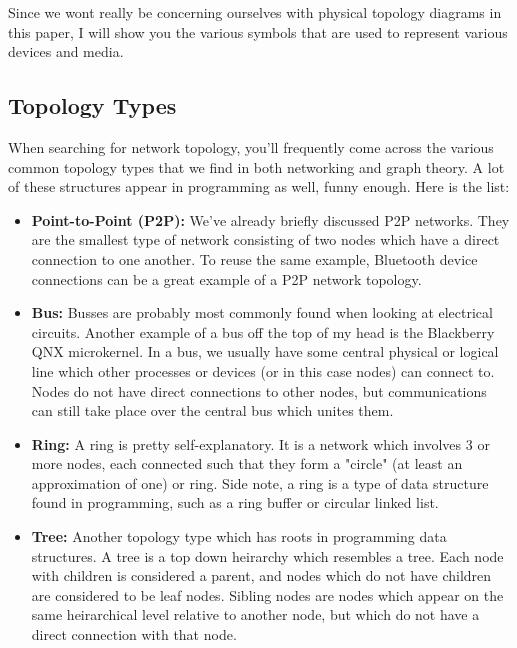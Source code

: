 \documentclass{article}
\begin{document}
Since we wont really be concerning ourselves with physical topology diagrams in this paper, I will show you the
various symbols that are used to represent various devices and media.

\subsection{Topology Types}

When searching for network topology, you'll frequently come across the various common topology types that we
find in both networking and graph theory. A lot of these structures appear in programming as well, funny enough.
Here is the list:

\begin{itemize}

\item{%
    \textbf{Point-to-Point (P2P):} We've already briefly discussed P2P networks. They are the smallest type
    of network consisting of two nodes which have a direct connection to one another. To reuse the same
    example, Bluetooth device connections can be a great example of a P2P network topology.
}

\item{%
    \textbf{Bus:} Busses are probably most commonly found when looking at electrical circuits. Another example
    of a bus off the top of my head is the Blackberry QNX microkernel. In a bus, we usually have some central
    physical or logical line which other processes or devices (or in this case nodes) can connect to. Nodes do
    not have direct connections to other nodes, but communications can still take place over the central bus
    which unites them.
}

\item{%
    \textbf{Ring:} A ring is pretty self-explanatory. It is a network which involves 3 or more nodes, each
    connected such that they form a "circle" (at least an approximation of one) or ring. Side note, a ring is
    a type of data structure found in programming, such as a ring buffer or circular linked list.
}

\item{%
    \textbf{Tree:} Another topology type which has roots in programming data structures. A tree is a top down
    heirarchy which resembles a tree. Each node with children is considered a parent, and nodes which do not
    have children are considered to be leaf nodes. Sibling nodes are nodes which appear on the same
    heirarchical level relative to another node, but which do not have a direct connection with that node.
}


\end{itemize}
\end{document}
